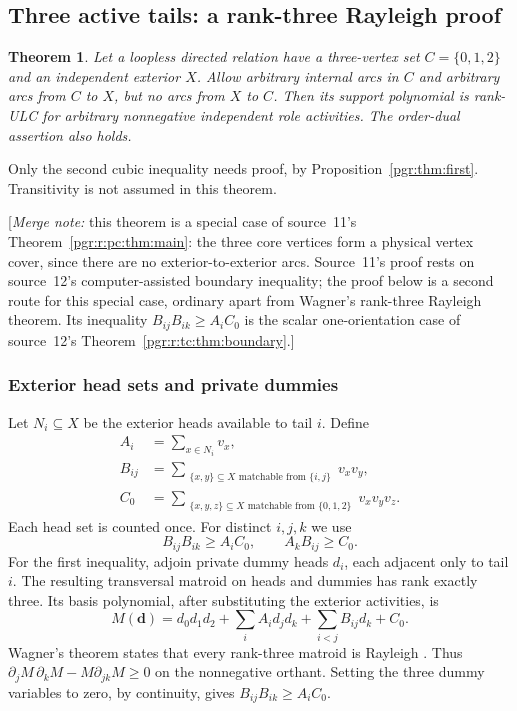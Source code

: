 \documentclass[11pt]{article}
\numberwithin{equation}{section}
\newtheorem{theorem}{Theorem}[section]\newtheorem{lemma}[theorem]{Lemma}\newtheorem{proposition}[theorem]{Proposition}\newtheorem{corollary}[theorem]{Corollary}
\theoremstyle{definition}\newtheorem{definition}[theorem]{Definition}\newtheorem{remark}[theorem]{Remark}
\newcommand{\mnote}[1]{[\textit{Merge note:} #1]}
\begin{document}
\subsection{Three active tails: a rank-three Rayleigh proof}\label{pgr:r:ir:sec:rayleigh}
\begin{theorem}\label{pgr:r:ir:thm:three}
Let a loopless directed relation have a three-vertex set $C=\{0,1,2\}$ and an independent exterior $X$. Allow arbitrary internal arcs in $C$ and arbitrary arcs from $C$ to $X$, but no arcs from $X$ to $C$. Then its support polynomial is rank-ULC for arbitrary nonnegative independent role activities. The order-dual assertion also holds.
\end{theorem}
Only the second cubic inequality needs proof, by Proposition~\ref{pgr:thm:first}. Transitivity is not assumed in this theorem.

\mnote{this theorem is a special case of source~11's
Theorem~\ref{pgr:r:pc:thm:main}: the three core vertices form a physical
vertex cover, since there are no exterior-to-exterior arcs. Source~11's
proof rests on source~12's computer-assisted boundary inequality; the proof
below is a second route for this special case, ordinary apart from
Wagner's rank-three Rayleigh theorem. Its inequality $B_{ij}B_{ik}\ge
A_iC_0$ is the scalar one-orientation case of source~12's
Theorem~\ref{pgr:r:tc:thm:boundary}.}


\subsubsection{Exterior head sets and private dummies}
Let $N_i\subseteq X$ be the exterior heads available to tail $i$. Define
\begin{align*}
 A_i&=\sum_{x\in N_i}v_x,\\
 B_{ij}&=\sum_{\substack{\{x,y\}\subseteq X\text{ matchable from }\{i,j\}}}v_xv_y,\\
 C_0&=\sum_{\substack{\{x,y,z\}\subseteq X\text{ matchable from }\{0,1,2\}}}v_xv_yv_z.
\end{align*}
Each head set is counted once. For distinct $i,j,k$ we use
\begin{equation}\label{pgr:r:ir:eq:exteriorineq}
 B_{ij}B_{ik}\ge A_i C_0,
 \qquad A_k B_{ij}\ge C_0.
\end{equation}
For the first inequality, adjoin private dummy heads $d_i$, each adjacent only to tail $i$. The resulting transversal matroid on heads and dummies has rank exactly three. Its basis polynomial, after substituting the exterior activities, is
\begin{equation}\label{pgr:r:ir:eq:dummy}
 M(\mathbf d)=d_0d_1d_2+\sum_i A_i d_jd_k+\sum_{i<j}B_{ij}d_k+C_0.
\end{equation}
Wagner's theorem states that every rank-three matroid is Rayleigh \cite[Theorem 1.1]{WagnerR3}. Thus
$\partial_jM\,\partial_kM-M\partial_{jk}M\ge0$ on the nonnegative orthant. Setting the three dummy variables to zero, by continuity, gives $B_{ij}B_{ik}\ge A_i C_0$.
\end{document}
